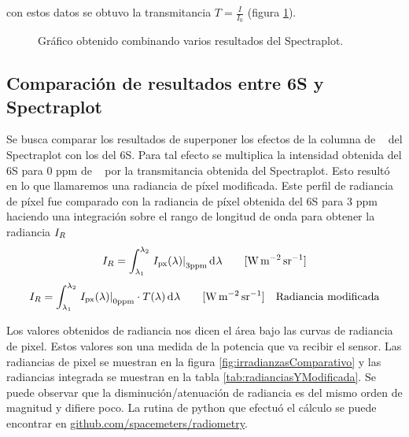 \documentclass[titlepage,11pt]{article}
\begin{document}
con estos datos se obtuvo la transmitancia $T = \frac{I}{I_0}$ (figura \ref{fig:transmitancia100km3ppm}).

\begin{figure}[htb!]
    \centering
    \caption{Gráfico obtenido combinando varios resultados del Spectraplot.}
    \label{fig:transmitancia100km3ppm}
\end{figure}


\subsection{Comparaci\'on de resultados entre 6S y Spectraplot}
Se busca comparar los resultados de superponer los efectos de la columna de \metano~ del Spectraplot con los del 6S. Para tal efecto se multiplica la intensidad obtenida del 6S para 0 ppm de \metano~ por la transmitancia obtenida del Spectraplot. Esto resultó en lo que llamaremos una radiancia de píxel modificada. Este perfil de radiancia de píxel fue comparado con la radiancia de píxel obtenida del 6S para 3 ppm haciendo una integración sobre el rango de longitud de onda para obtener la radiancia $I_R$
\begin{equation}
    \radiance = \int_{\lambda_1}^{\lambda_2} \left.\pixrad(\lambda)\right|_{\text{3ppm}}  \diff \lambda \qquad [\radianceunits] 
\end{equation}
\begin{equation}
    \radiance = \int_{\lambda_1}^{\lambda_2} \left.\pixrad(\lambda)\right|_{\text{0ppm}} \cdot T(\lambda) \diff \lambda \qquad [\radianceunits] \quad \text{Radiancia modificada}
\end{equation}

Los valores obtenidos de radiancia nos dicen el área bajo las curvas de radiancia de pixel. Estos valores son una medida de la potencia que va recibir el sensor. Las radiancias de pixel se muestran en la figura \ref{fig:irradianzasComparativo} y las radiancias integrada se muestran en la tabla \ref{tab:radianciasYModificada}. Se puede observar que la disminución/atenuación de radiancia es del mismo orden de magnitud y difiere poco. La rutina de python que efectuó el cálculo se puede encontrar en \href{https://github.com/spacemeters/radiometry/blob/master/etapa4/validation.py}{github.com/spacemeters/radiometry}.
\end{document}
